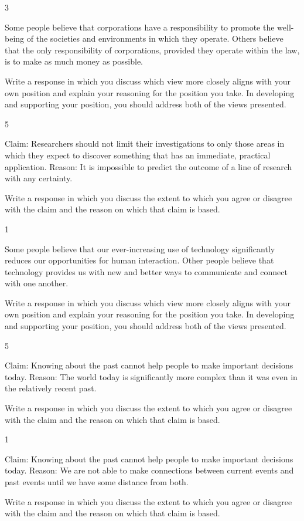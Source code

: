 \documentclass[]{article}
\begin{document}
3

Some people believe that corporations have a responsibility to promote
the well-being of the societies and environments in which they operate.
Others believe that the only responsibility of corporations, provided
they operate within the law, is to make as much money as possible.

Write a response in which you discuss which view more closely aligns
with your own position and explain your reasoning for the position you
take. In developing and supporting your position, you should address
both of the views presented.

5

Claim: Researchers should not limit their investigations to only those
areas in which they expect to discover something that has an immediate,
practical application. Reason: It is impossible to predict the outcome
of a line of research with any certainty.

Write a response in which you discuss the extent to which you agree or
disagree with the claim and the reason on which that claim is based.

1

Some people believe that our ever-increasing use of technology
significantly reduces our opportunities for human interaction. Other
people believe that technology provides us with new and better ways to
communicate and connect with one another.

Write a response in which you discuss which view more closely aligns
with your own position and explain your reasoning for the position you
take. In developing and supporting your position, you should address
both of the views presented.

5

Claim: Knowing about the past cannot help people to make important
decisions today. Reason: The world today is significantly more complex
than it was even in the relatively recent past.

Write a response in which you discuss the extent to which you agree or
disagree with the claim and the reason on which that claim is based.

1

Claim: Knowing about the past cannot help people to make important
decisions today. Reason: We are not able to make connections between
current events and past events until we have some distance from both.

Write a response in which you discuss the extent to which you agree or
disagree with the claim and the reason on which that claim is based.
\end{document}
